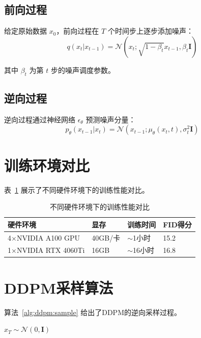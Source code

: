 \subsection{前向过程}

给定原始数据 $x_0$，前向过程在 $T$ 个时间步上逐步添加噪声：
\begin{equation}
	\label{equ:forward}
	q(x_t | x_{t-1}) = \mathcal{N}(x_t; \sqrt{1-\beta_t} x_{t-1}, \beta_t \mathbf{I})
\end{equation}

其中 $\beta_t$ 为第 $t$ 步的噪声调度参数。

\subsection{逆向过程}

逆向过程通过神经网络 $\epsilon_\theta$ 预测噪声分量：
\begin{equation}
	\label{equ:reverse}
	p_\theta(x_{t-1} | x_t) = \mathcal{N}(x_{t-1}; \mu_\theta(x_t, t), \sigma_t^2 \mathbf{I})
\end{equation}

\section{训练环境对比}

表~\ref{tab:ch2:hardware} 展示了不同硬件环境下的训练性能对比。

\begin{table}[htbp]
	\wuhao\centering
	\caption{不同硬件环境下的训练性能对比}
	\label{tab:ch2:hardware}
	\begin{tabular}{m{4cm}<{\centering}m{2.5cm}<{\centering}m{2.5cm}<{\centering}m{2cm}<{\centering}}
		\toprule[1.5pt]
		硬件环境 & 显存 & 训练时间 & FID得分 \\
		\midrule[0.5pt]
		4$\times$NVIDIA A100 GPU & 40GB/卡 & $\sim$1小时 & 15.2 \\
		1$\times$NVIDIA RTX 4060Ti & 16GB & $\sim$16小时 & 16.8 \\
		\bottomrule[1.5pt]
	\end{tabular}
\end{table}

\section{DDPM采样算法}

算法~\ref{alg:ddpm:sample} 给出了DDPM的逆向采样过程。

\begin{myAlgorithm}
	\caption{DDPM逆向采样算法}
	\label{alg:ddpm:sample}
	$x_T \sim \mathcal{N}(0, \mathbf{I})$\;
\end{myAlgorithm}
